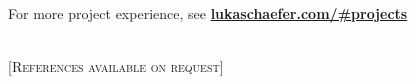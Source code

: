\documentclass[]{lukas-cv-openfont}
\begin{document}



\vspace{-.2em}

\begin{flushleft}
    For more project experience, see \href{https://www.lukaschaefer.com/#projects}{\textbf{lukaschaefer.com/\#projects}}
\end{flushleft}
\sectionsep





\ \\

[\scshape{}\fontsize{10pt}{8pt}\selectfont References available on request]%
\end{document}
